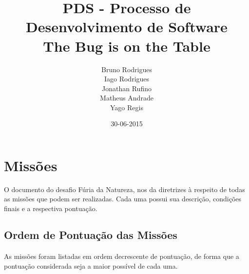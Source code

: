 \documentclass{article}
\title{PDS - Processo de Desenvolvimento de Software\\The Bug is on the Table}
\date{30-06-2015}
\author{Bruno Rodrigues\\Iago Rodrigues\\Jonathan Rufino\\Matheus Andrade\\Yago Regis}
\begin{document}
	\maketitle
	\newpage

\newpage
\listoffigures

\newpage
\listoftables

\newpage
\tableofcontents

\newpage
\section{Missões}
	\paragraph{}
		O documento do desafio Fúria da Natureza, nos da diretrizes à respeito de todas as missões que podem ser realizadas. Cada uma possui sua descrição, condições finais e a respectiva pontuação.

	\subsection{Ordem de Pontuação das Missões}
		\paragraph{}
			As missões foram listadas em ordem decrescente de pontuação, de forma que a pontuação considerada seja a maior possível de cada uma.
\end{document}
